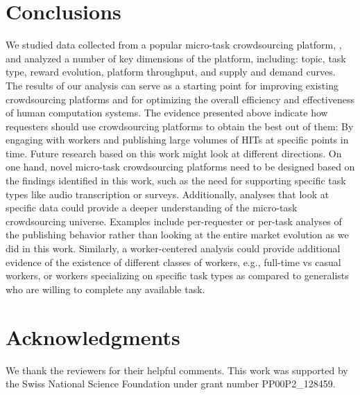 \section{Conclusions}\label{sec:conc}
We studied data collected from a popular micro-task crowdsourcing platform, \amt{},
and analyzed a number of key dimensions of the platform, including: topic, task type, reward evolution, platform throughput, and supply and demand curves. The results of our analysis can serve as a starting point for improving existing crowdsourcing platforms and for optimizing the overall efficiency and effectiveness of human computation systems. The evidence presented above indicate how requesters should use crowdsourcing platforms to obtain the best out of them: By engaging with workers and publishing large volumes of HITs at specific points in time. 
Future research based on this work might look at different directions. On one hand, novel micro-task crowdsourcing platforms need to be designed based on the findings identified in this work, such as the need for supporting specific task types like audio transcription or surveys. 
Additionally, analyses that look at specific data could provide a deeper understanding of the micro-task crowdsourcing universe. Examples include per-requester or per-task analyses of the publishing behavior rather than looking at the entire market evolution as we did in this work.
Similarly, a worker-centered analysis could provide additional evidence of the existence of different classes of workers, e.g., full-time vs casual workers, or workers specializing on specific task types as compared to generalists who are willing to complete any  available task.

\section{Acknowledgments}
We thank the  reviewers for their helpful comments.
%
This work was supported by the Swiss National Science Foundation under grant number PP00P2\_128459.